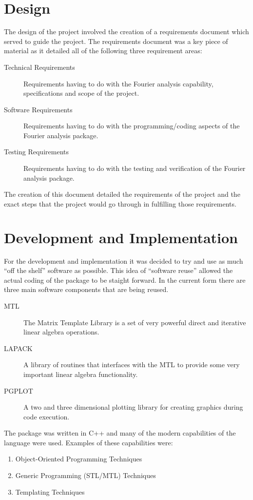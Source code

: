 \documentclass[11pt]{rnote}
\begin{document}
\section{Design}
\noindent
The design of the project involved the creation of a requirements
document which served to guide the project.  The requirements document 
was a key piece of material as it detailed all of the following three
requirement areas:
\begin{description}
 \item [Technical Requirements] Requirements having to do with the
   Fourier analysis capability, specifications and scope of the project.
 \item [Software Requirements] Requirements having to do with the
   programming/coding aspects of the Fourier analysis package.
 \item [Testing Requirements] Requirements having to do with the
 testing and verification of the Fourier analysis package.
\end{description}
The creation of this document detailed the requirements of the project 
and the exact steps that the project would go through in fulfilling
those requirements.
\section{Development and Implementation}
\noindent
For the development and implementation it was decided to try and use 
as much ``off the shelf'' software as possible.  This idea of
``software reuse'' allowed the actual coding of the package to be
staight forward.  In the current form there are three main software
components that are being reused.
\begin{description}
 \item [MTL] The Matrix Template Library is a set of very powerful
   direct and iterative linear algebra operations.
 \item [LAPACK] A library of routines that interfaces with the MTL to
   provide some very important linear algebra functionality.
 \item [PGPLOT] A two and three dimensional plotting library for
   creating graphics during code execution.
\end{description} 
The package was written in C++ and many of the modern capabilities of the
language were used.  Examples of these capabilities were:
\begin{enumerate}
 \item Object-Oriented Programming Techniques
 \item Generic Programming (STL/MTL) Techniques
 \item Templating Techniques
\end{enumerate}
\end{document}
